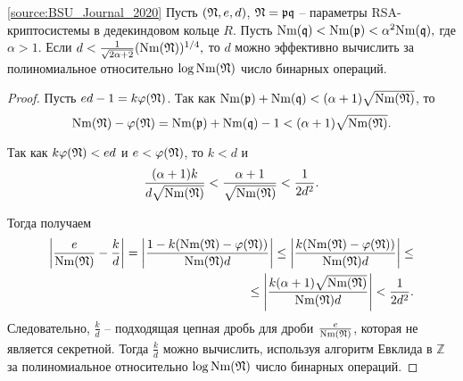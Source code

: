 \documentclass[_00_dissertation.tex]{subfiles}
\begin{document}
\begin{theorem}\label{theorem:Wiener}\ref{source:BSU_Journal_2020}
    Пусть $(\mathfrak{N},e,d)$, $\mathfrak{N}=\mathfrak{p} \mathfrak{q}$ -- параметры RSA-криптосистемы в дедекиндовом кольце $R$.
    Пусть $\textrm{Nm}(\mathfrak{q}) < \textrm{Nm}(\mathfrak{p}) < \alpha^2 \textrm{Nm}(\mathfrak{q}),$ где $\alpha > 1.$
    Если $d<\frac{1}{\sqrt{2\alpha+2}}(\textrm{Nm}(\mathfrak{N}))^{1/4},$ то $d$ можно эффективно вычислить за полиномиальное относительно $\log \textrm{Nm}(\mathfrak{N})$ число бинарных операций.
\end{theorem}
\begin{proof}
    Пусть $ed - 1 = k \varphi(\mathfrak{N})$.
    Так как $\textrm{Nm}(\mathfrak{p}) + \textrm{Nm}(\mathfrak{q}) < (\alpha + 1)\sqrt{\textrm{Nm}(\mathfrak{N})}$, то
    \begin{equation*}
        \textrm{Nm}(\mathfrak{N}) - \varphi(\mathfrak{N}) = \textrm{Nm}(\mathfrak{p}) + \textrm{Nm}(\mathfrak{q}) - 1 < (\alpha + 1)\sqrt{\textrm{Nm}(\mathfrak{N})}.
    \end{equation*}
    
    Так как $k \varphi(\mathfrak{N}) < ed$ и $e < \varphi(\mathfrak{N})$, то $k < d$ и
    \begin{equation*}
        \frac{(\alpha + 1)k}{d\sqrt{\textrm{Nm}(\mathfrak{N})}} < \frac{\alpha + 1}{\sqrt{\textrm{Nm}(\mathfrak{N})}} < \frac{1}{2 d^2}.
    \end{equation*}
    
    Тогда получаем
    \begin{equation*}
        \begin{split}
            \left|
                \frac{e}{\textrm{Nm}(\mathfrak{N})} - \frac{k}{d}
            \right| = \left|
                \frac{1 - k(\textrm{Nm}(\mathfrak{N}) - \varphi(\mathfrak{N}))}{\textrm{Nm}(\mathfrak{N})d}
            \right| \le \left|
                \frac{k(\textrm{Nm}(\mathfrak{N}) - \varphi(\mathfrak{N}))}{\textrm{Nm}(\mathfrak{N})d}
            \right| \le \\
            \le \left|
                \frac{k(\alpha + 1)\sqrt{\textrm{Nm}(\mathfrak{N})}}{\textrm{Nm}(\mathfrak{N})d}
            \right| < \frac{1}{2 d^2}.
        \end{split}
    \end{equation*}
    Следовательно, $\frac{k}{d}$ -- подходящая цепная дробь для дроби $\frac{e}{\textrm{Nm}(\mathfrak{N})}$, которая не является секретной.
    Тогда $\frac{k}{d}$ можно вычислить, используя алгоритм Евклида в $\mathbb{Z}$ за полиномиальное относительно $\log \textrm{Nm}(\mathfrak{N})$ число бинарных операций.
\end{proof}
\end{document}
